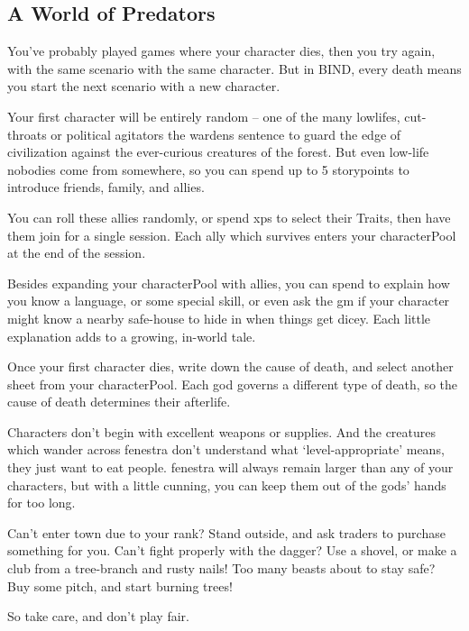 \begin{multicols}{2}

\subsection*{A World of Predators}

You've probably played games where your character dies, then you try again, with the same scenario with the same character.
But in BIND, every death means you start the next scenario with a new character.

Your first character will be entirely random -- one of the many lowlifes, cut-throats or political agitators the \glspl{warden} sentence to guard the \gls{edge} of civilization against the ever-curious creatures of the forest.
But even low-life nobodies come from somewhere, so you can spend up to 5 \glspl{storypoint} to introduce friends, family, and allies.

You can roll these allies randomly, or spend \glspl{xp} to select their Traits, then have them join for a single session.
Each ally which survives enters your \gls{characterPool} at the end of the session.

Besides expanding your \gls{characterPool} with allies, you can spend  to explain how you know a language, or some special skill, or even ask the \gls{gm} if your character might know a nearby safe-house to hide in when things get dicey.
Each little explanation adds to a growing, in-world tale.

Once your first character dies, write down the cause of death, and select another sheet from your \gls{characterPool}.
Each god governs a different type of death, so the cause of death determines their afterlife.

Characters don't begin with excellent weapons or supplies.
And the creatures which wander across \gls{fenestra} don't understand what `level-appropriate' means, they just want to eat people.
\Gls{fenestra} will always remain larger than any of your characters, but with a little cunning, you can keep them out of the gods' hands for too long.

Can't enter town due to your rank?
Stand outside, and ask traders to purchase something for you.
Can't fight properly with the dagger?
Use a shovel, or make a club from a tree-branch and rusty nails!
Too many beasts about to stay safe?
Buy some pitch, and start burning trees!

So take care, and don't play fair.


\end{multicols}
